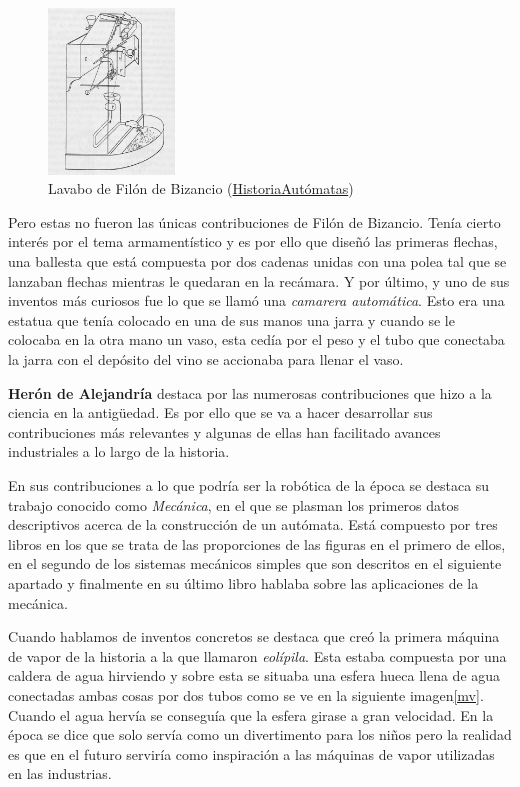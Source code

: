 \begin{figure}[H]
\begin{center}
  \includegraphics[width=0.3\textwidth]{./EtapaPrimeriza/imagenes/lavabo.jpg}
  \caption{Lavabo de Filón de Bizancio (\href{http://historiautomatas.blogspot.com/2010/06/grecia-ii-filon-de-bizancio.html} {HistoriaAutómatas})}
  \label{lavabo}
\end{center}
\end{figure}

Pero estas no fueron las únicas contribuciones de Filón de Bizancio. Tenía cierto interés por el tema armamentístico y es por ello que diseñó las primeras flechas, una ballesta que está compuesta por dos cadenas unidas con una polea tal que se lanzaban flechas mientras le quedaran en la recámara. Y por último, y uno de sus inventos más curiosos fue lo que se llamó una \textit{camarera automática}. Esto era una estatua que tenía colocado en una de sus manos una jarra y cuando se le colocaba en la otra mano un vaso, esta cedía por el peso y el tubo que conectaba la jarra con el depósito del vino se accionaba para llenar el vaso. 



\textbf{Herón de Alejandría} destaca por las numerosas contribuciones que hizo a la ciencia en la antigüedad. Es por ello que se va a hacer desarrollar sus contribuciones más relevantes y algunas de ellas han facilitado avances industriales a lo largo de la historia.

En sus contribuciones a lo que podría ser la robótica de la época se destaca su trabajo conocido como \textit{Mecánica}, en el que se plasman los primeros datos descriptivos acerca de la construcción de un autómata. Está compuesto por tres libros en los que se trata de las proporciones de las figuras en el primero de ellos, en el segundo de los sistemas mecánicos simples que son descritos en el siguiente apartado y finalmente en su último libro hablaba sobre las aplicaciones de la mecánica.

Cuando hablamos de inventos concretos se destaca que creó la primera máquina de vapor de la historia a la que llamaron \textit{eolípila}. Esta estaba compuesta por una caldera de agua hirviendo y sobre esta se situaba una esfera hueca llena de agua conectadas ambas cosas por dos tubos como se ve en la siguiente imagen\ref{mv}. Cuando el agua hervía se conseguía que la esfera girase a gran velocidad. En la época se dice que solo servía como un divertimento para los niños pero la realidad es que en el futuro serviría como inspiración a las máquinas de vapor utilizadas en las industrias.

